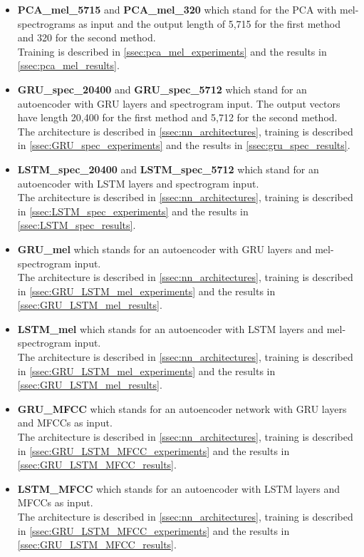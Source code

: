 \begin{itemize}
    \item \textbf{PCA\_mel\_5715} and \textbf{PCA\_mel\_320} which stand for the PCA with mel-spectrograms as input and the output length of 5,715 for the first method and 320 for the second method. \\
        Training is described in \ref{ssec:pca_mel_experiments} and the results in \ref{ssec:pca_mel_results}.
    \item \textbf{GRU\_spec\_20400} and \textbf{GRU\_spec\_5712} which stand for an autoencoder with GRU layers and spectrogram input. The output vectors have length 20,400 for the first method and 5,712 for the second method. \\
    The architecture is described in \ref{ssec:nn_architectures}, training is described in \ref{ssec:GRU_spec_experiments} and the results in \ref{ssec:gru_spec_results}.
    \item \textbf{LSTM\_spec\_20400} and \textbf{LSTM\_spec\_5712} which stand for an autoencoder with LSTM layers and spectrogram input. \\
        The architecture is described in \ref{ssec:nn_architectures}, training is described in \ref{ssec:LSTM_spec_experiments} and the results in \ref{ssec:LSTM_spec_results}.
    \item \textbf{GRU\_mel} which stands for an autoencoder with GRU layers and mel- spectrogram input. \\
        The architecture is described in \ref{ssec:nn_architectures}, training is described in \ref{ssec:GRU_LSTM_mel_experiments} and the results in \ref{ssec:GRU_LSTM_mel_results}.
    \item \textbf{LSTM\_mel} which stands for an autoencoder with LSTM layers and mel- spectrogram input. \\
    The architecture is described in \ref{ssec:nn_architectures}, training is described in \ref{ssec:GRU_LSTM_mel_experiments} and the results in \ref{ssec:GRU_LSTM_mel_results}.
    \item \textbf{GRU\_MFCC} which stands for an autoencoder network with GRU layers and MFCCs as input. \\
        The architecture is described in \ref{ssec:nn_architectures}, training is described in \ref{ssec:GRU_LSTM_MFCC_experiments} and the results in \ref{ssec:GRU_LSTM_MFCC_results}.
    \item \textbf{LSTM\_MFCC} which stands for an autoencoder with LSTM layers and MFCCs as input. \\
        The architecture is described in \ref{ssec:nn_architectures}, training is described in \ref{ssec:GRU_LSTM_MFCC_experiments} and the results in \ref{ssec:GRU_LSTM_MFCC_results}.

    
\end{itemize}

